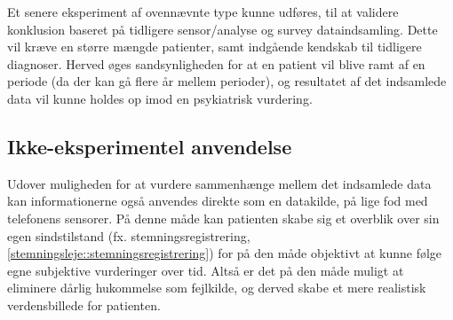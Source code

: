 Et senere eksperiment af ovennævnte type kunne udføres, til at validere konklusion baseret på tidligere sensor/analyse og survey dataindsamling.
Dette vil kræve en større mængde patienter, samt indgående kendskab til tidligere diagnoser.
Herved øges sandsynligheden for at en patient vil blive ramt af en periode (da der kan gå flere år mellem perioder), og resultatet af det indsamlede data vil kunne holdes op imod en psykiatrisk vurdering.

\subsection{Ikke-eksperimentel anvendelse}
Udover muligheden for at vurdere sammenhænge mellem det indsamlede data kan informationerne også anvendes direkte som en datakilde, på lige fod med telefonens sensorer.
På denne måde kan patienten skabe sig et overblik over sin egen sindstilstand (fx. stemningsregistrering, \cref{stemningsleje::stemningsregistrering}) for på den måde objektivt at kunne følge egne subjektive vurderinger over tid.
Altså er det på den måde muligt at eliminere dårlig hukommelse som fejlkilde, og derved skabe et mere realistisk verdensbillede for patienten.
